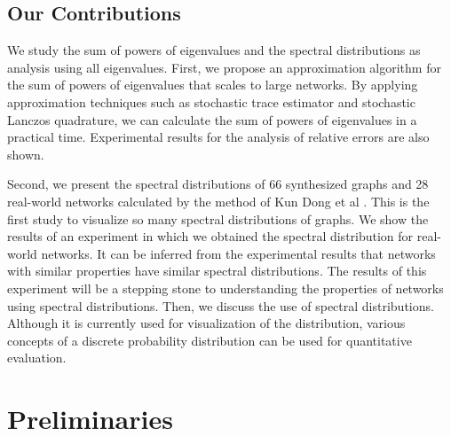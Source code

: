 \documentclass[senior,final,11pt]{iscs-thesis}
\begin{document}
\section{Our Contributions}
We study the sum of powers of eigenvalues and the spectral distributions as analysis using all eigenvalues. First, we propose an approximation algorithm for the sum of powers of eigenvalues that scales to large networks. By applying approximation techniques such as stochastic trace estimator and stochastic Lanczos quadrature, we can calculate the sum of powers of eigenvalues in a practical time. Experimental results for the analysis of relative errors are also shown.

Second, we present the spectral distributions of 66 synthesized graphs and 28 real-world networks calculated by the method of Kun Dong et al \cite{dong2019network}. This is the first study to visualize so many spectral distributions of graphs. We show the results of an experiment in which we obtained the spectral distribution for real-world networks. It can be inferred from the experimental results that networks with similar properties have similar spectral distributions. The results of this experiment will be a stepping stone to understanding the properties of networks using spectral distributions. Then, we discuss the use of spectral distributions. Although it is currently used for visualization of the distribution, various concepts of a discrete probability distribution can be used for quantitative evaluation.

\chapter{Preliminaries}
\end{document}
